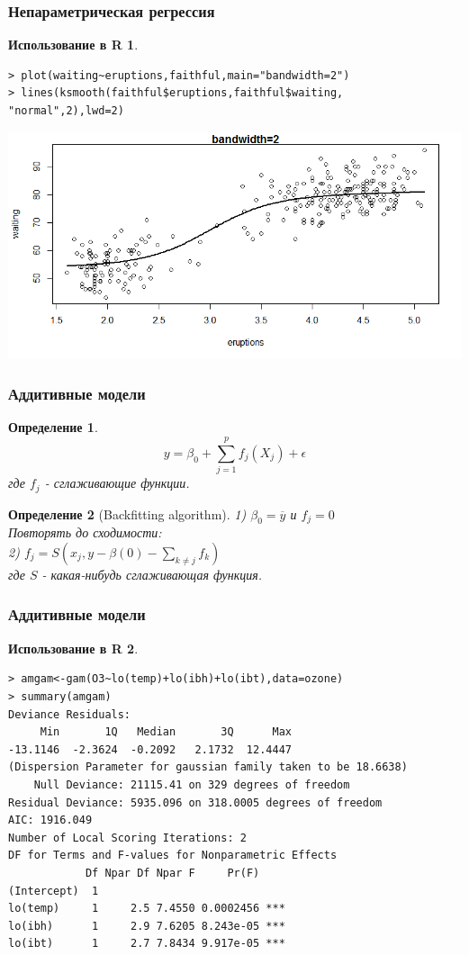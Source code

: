 \documentclass{beamer}
\newtheorem{defn}{Определение}
\newtheorem{exmpr}{Использование в R}
\begin{document}
\begin{frame}[containsverbatim]
\frametitle{Непараметрическая регрессия}
\begin{exmpr}
\begin{verbatim}
> plot(waiting~eruptions,faithful,main="bandwidth=2")
> lines(ksmooth(faithful$eruptions,faithful$waiting,
"normal",2),lwd=2)
\end{verbatim}
\end{exmpr}
\includegraphics[width=1\textwidth,height=0.6\textheight]{ksmoothplot3.png}
\end{frame}

\begin{frame}
\frametitle{Аддитивные модели}
\begin{defn}
$$y=\beta_0+\sum_{j=1}^p{f_j(X_j)}+\epsilon$$
где $f_j$ - сглаживающие функции.
\end{defn}
\begin{defn}[Backfitting algorithm]
1) $\beta_0=\overline{y}$ и $f_j=0$\\
Повторять до сходимости:\\
2) $f_j=S(x_j,y-\beta(0)-\sum_{k\neq j}f_k)$\\
где $S$ - какая-нибудь сглаживающая функция.
\end{defn}
\end{frame}

\begin{frame}[containsverbatim]
\frametitle{Аддитивные модели}
\begin{exmpr}
\begin{verbatim}
> amgam<-gam(O3~lo(temp)+lo(ibh)+lo(ibt),data=ozone)
> summary(amgam)
Deviance Residuals:
     Min       1Q   Median       3Q      Max 
-13.1146  -2.3624  -0.2092   2.1732  12.4447 
(Dispersion Parameter for gaussian family taken to be 18.6638)
    Null Deviance: 21115.41 on 329 degrees of freedom
Residual Deviance: 5935.096 on 318.0005 degrees of freedom
AIC: 1916.049 
Number of Local Scoring Iterations: 2 
DF for Terms and F-values for Nonparametric Effects
            Df Npar Df Npar F     Pr(F)    
(Intercept)  1                             
lo(temp)     1     2.5 7.4550 0.0002456 ***
lo(ibh)      1     2.9 7.6205 8.243e-05 ***
lo(ibt)      1     2.7 7.8434 9.917e-05 ***
\end{verbatim}
\end{exmpr}
\end{frame}
\end{document}
